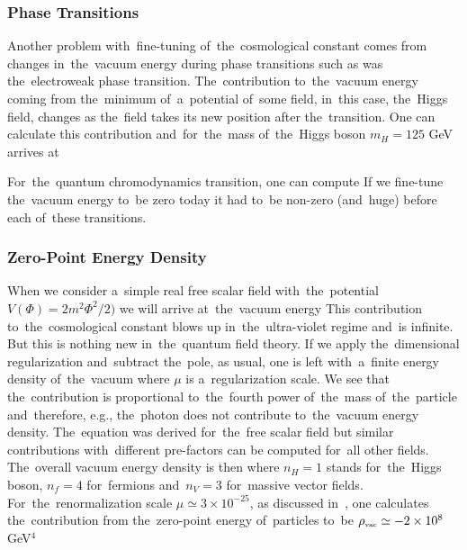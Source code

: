 \subsubsection{Phase Transitions}
\begin{sloppypar}
Another problem with~fine-tuning of~the~cosmological constant comes from changes in~the~vacuum energy during phase transitions such as was the~electroweak phase transition. The~contribution to~the~vacuum energy coming from the~minimum of~a~potential of~some field, in~this case, the~Higgs field, changes as the~field takes its new position after the~transition. One can calculate this contribution \parencite{2012CRPhy..13..566M} and~for~the~mass of~the~Higgs boson $m_H=125$ GeV arrives at
\end{sloppypar}
For~the~quantum chromodynamics transition, one can compute
If we fine-tune the~vacuum energy to~be zero today it had to~be non-zero (and~huge) before each of~these transitions.
\subsubsection{Zero-Point Energy Density}
When we consider a~simple real free scalar field with~the~potential $V(\Phi)=2m^2\Phi^2/2)$ we will arrive at~the~vacuum energy
This contribution to~the~cosmological constant blows up in~the~ultra-violet regime and~is infinite. But this is nothing new in~the~quantum field theory. If we apply the~dimensional regularization \parencite{tHooft:1972tcz} and~subtract the~pole, as usual, one is left with~a~finite energy density of~the~vacuum
where $\mu$ is a~regularization scale. We see that the~contribution is proportional to~the~fourth power of~the~mass of~the~particle and~therefore, e.g., the~photon does not contribute to~the~vacuum energy density. The~equation was derived for~the~free scalar field but similar contributions with~different pre-factors can be computed for~all other fields. The~overall vacuum energy density is then
where $n_H=1$ stands for~the~Higgs boson, $n_f=4$ for~fermions and~$n_V=3$ for~massive vector fields. For~the~renormalization scale $\mu\simeq3\times10^{-25}$, as discussed in~\textcite{2011arXiv1105.6296K}, one calculates the~contribution from the~zero-point energy of~particles to~be  $\rho_\text{\tiny vac}\simeq-2\times10^8$ GeV$^4$

